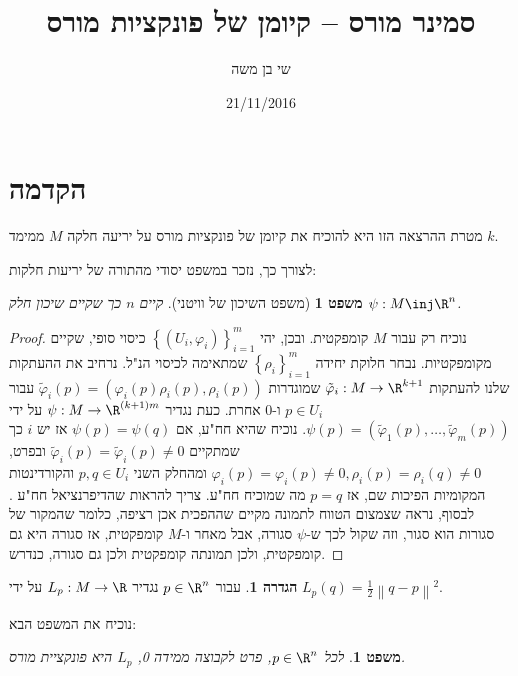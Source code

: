 \documentclass{article}
\title{סמינר מורס – קיומן של פונקציות מורס}
\author{שי בן משה}
\date{21/11/2016}
\newtheorem{theorem}{משפט}
\newtheorem*{theorem*}{משפט}
\theoremstyle{definition}
\newtheorem*{definition*}{הגדרה}
\newcommand{\norm}[1]{\left\lVert#1\right\rVert}
\begin{document}
	\maketitle
	
	
	
	
	\section{הקדמה}
	
	מטרת ההרצאה הזו היא להוכיח את קיומן של פונקציות מורס על יריעה חלקה \(M\) ממימד \(k\).
	
	לצורך כך, נזכר במשפט יסודי מהתורה של יריעות חלקות:
	\begin{theorem*}[משפט השיכון של וויטני]
		קיים \(n\) כך שקיים שיכון חלק
		\(\psi: M \inj \R^n\).
	\end{theorem*}
	\begin{proof}
		נוכיח רק עבור \(M\) קומפקטית.
		ובכן, יהי
		\(\left\{\left(U_i,\varphi_i\right)\right\}_{i=1}^m\)
		כיסוי סופי, שקיים מקומפקטיות.
		נבחר חלוקת יחידה
		\(\left\{\rho_i\right\}_{i=1}^m\)
		שמתאימה לכיסוי הנ"ל.
		נרחיב את ההעתקות שלנו להעתקות
		\(\tilde{\varphi}_i: M \to \R^{k+1}\)
		שמוגדרות
		\(\tilde{\varphi}_i(p) = \left(\varphi_i(p)\rho_i(p),\rho_i(p)\right)\)
		עבור
		\(p \in U_i\)
		ו-\(0\) אחרת.
		כעת נגדיר
		\(\psi: M \to \R^{(k+1)m}\)
		על ידי
		\(
			\psi(p)=\left(\tilde{\varphi}_1(p),\dotsc,\tilde{\varphi}_m(p)\right)
		\).
		נוכיח שהיא חח"ע, אם
		\(\psi(p)=\psi(q)\)
		אז יש \(i\) כך שמתקיים
		\(\tilde{\varphi}_i(p)=\tilde{\varphi}_i(p)\neq 0\)
		ובפרט,
		\(\varphi_i(p)=\varphi_i(p)\neq 0,\rho_i(p)=\rho_i(q)\neq 0\)
		ומהחלק השני
		\(p,q \in U_i\)
		והקורדינטות המקומיות הפיכות שם, אז
		\(p=q\)
		מה שמוכיח חח"ע.
		צריך להראות שהדיפרנציאל חח"ע
		.
		לבסוף, נראה שצמצום הטווח לתמונה מקיים שההפכית אכן רציפה, כלומר שהמקור של סגורות הוא סגור, וזה שקול לכך ש-\(\psi\) סגורה, אבל מאחר ו-\(M\) קומפקטית, אז סגורה היא גם קומפקטית, ולכן תמונתה קומפקטית ולכן גם סגורה, כנדרש.
	\end{proof}
	
	\begin{definition*}
		עבור
		\(p\in \R^n\)
		נגדיר
		\(L_p:M\to \R\)
		על ידי
		\(L_p(q)=\frac{1}{2}\norm{q-p}^2\).
	\end{definition*}

	נוכיח את המשפט הבא:
	\begin{theorem}\label{main-thm}
		לכל
		\(p\in \R^n\),
		פרט לקבוצה ממידה 0, \(L_p\) היא פונקציית מורס.
	\end{theorem}
\end{document}
